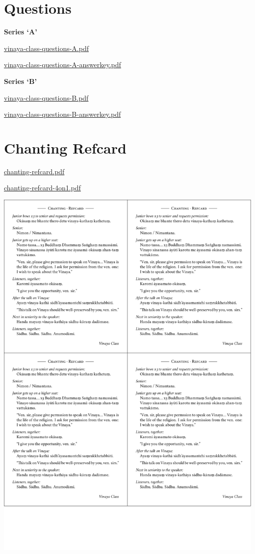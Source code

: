\section{Questions}

\textbf{Series `A'}

\href{./includes/docs/vinaya-class-questions-A.pdf}{vinaya-class-questions-A.pdf}

\href{./includes/docs/vinaya-class-questions-A-answerkey.pdf}{vinaya-class-questions-A-answerkey.pdf}

\textbf{Series `B'}

\href{./includes/docs/vinaya-class-questions-B.pdf}{vinaya-class-questions-B.pdf}

\href{./includes/docs/vinaya-class-questions-B-answerkey.pdf}{vinaya-class-questions-B-answerkey.pdf}

\section{Chanting Refcard}

\href{./includes/docs/chanting-refcard.pdf}{chanting-refcard.pdf}

\href{./includes/docs/chanting-refcard-4on1.pdf}{chanting-refcard-4on1.pdf}

\href{./includes/docs/chanting-refcard-4on1.pdf}{\includegraphics{./includes/docs/chanting-refcard-4on1-thumb.png}}

